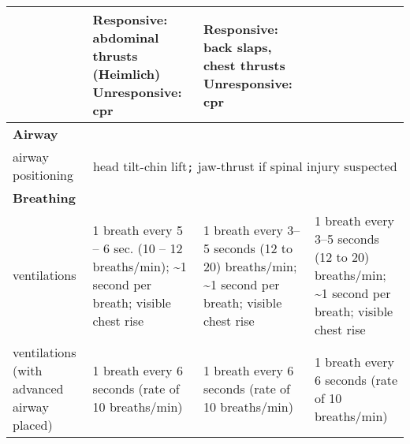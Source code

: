 \documentclass[../../EMT-169.tex]{subfiles}
\begin{document}
\begin{table}[ht]
\begin{tabular}{|p{3cm}|p{4cm}|p{4cm}|p{4cm}|}
																	 									  & \textbf{Responsive:} \newline abdominal thrusts (Heimlich) \newline \newline \newline \newline \textbf{Unresponsive:} \acrshort{cpr}
																	 									   										 			& \textbf{Responsive:} \newline back slaps, chest thrusts \newline \newline \newline \newline \newline \textbf{Unresponsive:} \acrshort{cpr} \\ \hline
		\multicolumn{4}{l|}{\bfseries Airway} \\ \hline
		airway \newline positioning 			 & \multicolumn{3}{c|}{head tilt-chin lift\texttt{;} \newline jaw-thrust if spinal injury suspected} \\ \hline
		\multicolumn{4}{l}{\bfseries Breathing} \\ \hline
		ventilations                             & 1 breath every 5 -- 6 sec. (10 -- 12 breaths/min); \newline \textasciitilde 1 second per breath; \newline visible chest rise
																										  & 1 breath every 3--5 seconds \newline (12 to 20) breaths/min; \newline \textasciitilde 1 second per breath; \newline visible chest rise
																																			 	 & 1 breath every 3--5 seconds \newline (12 to 20) breaths/min; \newline \textasciitilde 1 second per breath; \newline visible chest rise \\ \hline
		ventilations (with advanced airway placed) & 1 breath every 6 seconds (rate of 10 breaths/min)      & 1 breath every 6 seconds (rate of 10 breaths/min) 
																																				 & 1 breath every 6 seconds (rate of 10 breaths/min) \\ \hline
	\end{tabular}
	\egroup
\end{table}\hfill \\
\clearpage
\end{document}
